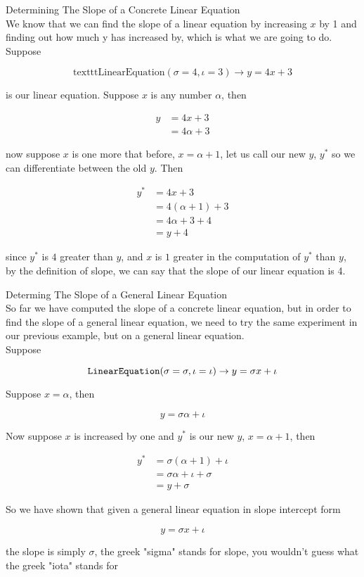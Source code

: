 \documentclass{book}
\begin{document}
  {\example Determining The Slope of a Concrete Linear Equation \\
    We know that we can find the slope of a linear equation by increasing $x$ by 1 and finding out how much y has increased by, which is what we are going to do. Suppose

    $$\text{texttt{LinearEquation}}(\sigma = 4, \iota = 3) \to y = 4x + 3$$

    is our linear equation. Suppose $x$ is any number $\alpha$, then

    \begin{align*}
      y & = 4x + 3\\
      & = 4 \alpha + 3
    \end{align*}

    now suppose $x$ is one more that before, $x = \alpha + 1$, let us call our new $y$, $y^*$ so we can differentiate between the old $y$. Then

    \begin{align*}
      y^* & = 4x + 3\\
      & = 4(\alpha + 1) + 3\\
      & = 4\alpha + 3 + 4\\
      & = y + 4
    \end{align*}

    since $y^*$ is $4$ greater than $y$, and $x$ is $1$ greater in the computation of $y^*$ than $y$, by the definition of slope, we can say that the slope of our linear equation is 4.\\
  }

  {\example Determing The Slope of a General Linear Equation \\
    So far we have computed the slope of a concrete linear equation, but in order to find the slope of a general linear equation, we need to try the same experiment in our previous example, but on a general linear equation.\\

    Suppose

    $$\text{\texttt{LinearEquation}}(\sigma = \sigma, \iota = \iota) \to y = \sigma x + \iota$$

    Suppose $x = \alpha$, then

    $$y = \sigma \alpha + \iota$$

    Now suppose $x$ is increased by one and $y^*$ is our new $y$, $x = \alpha + 1$, then

    \begin{align*}
      y^* & = \sigma (\alpha + 1) + \iota\\
      & = \sigma \alpha + \iota + \sigma\\
      & = y + \sigma
    \end{align*}

    So we have shown that given a general linear equation in slope intercept form

    $$y = \sigma x + \iota$$

    the slope is simply $\sigma$, the greek "sigma" stands for slope, you wouldn't guess what the greek "iota" stands for\\
  }
\end{document}
